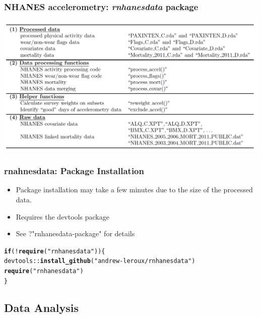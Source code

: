 \documentclass[10pt]{beamer}\usepackage[]{graphicx}\usepackage[]{color}
\makeatletter
\newcommand{\hlstr}[1]{\textcolor[rgb]{0.192,0.494,0.8}{#1}}%
\newcommand{\hlopt}[1]{\textcolor[rgb]{0,0,0}{#1}}%
\newcommand{\hlstd}[1]{\textcolor[rgb]{0.345,0.345,0.345}{#1}}%
\newcommand{\hlkwa}[1]{\textcolor[rgb]{0.161,0.373,0.58}{\textbf{#1}}}%
\newcommand{\hlkwd}[1]{\textcolor[rgb]{0.737,0.353,0.396}{\textbf{#1}}}%
\newenvironment{kframe}{%
 \def\at@end@of@kframe{}%
 \ifinner\ifhmode%
  \def\at@end@of@kframe{\end{minipage}}%
  \begin{minipage}{\columnwidth}%
 \fi\fi%
 \def\FrameCommand##1{\hskip\@totalleftmargin \hskip-\fboxsep
 \colorbox{shadecolor}{##1}\hskip-\fboxsep
     \hskip-\linewidth \hskip-\@totalleftmargin \hskip\columnwidth}%
 \MakeFramed {\advance\hsize-\width
   \@totalleftmargin\z@ \linewidth\hsize
   \@setminipage}}%
 {\par\unskip\endMakeFramed%
 \at@end@of@kframe}
\newenvironment{knitrout}{}{} %
\makeatother
\begin{document}
\begin{frame}
\frametitle{NHANES accelerometry: {\it rnhanesdata} package}
\includegraphics[width=\textwidth]{rnhanesdata}
\end{frame}


\begin{frame}[fragile]
\frametitle{rnahnesdata: Package Installation}

\begin{itemize}
\item Package installation may take a few minutes due to the size of the processed data.
\item Requires the devtools package 
\item See ?"rnhanesdata-package" for details
\end{itemize}

\begin{knitrout}\small
{}\color{fgcolor}\begin{kframe}
\begin{alltt}
\hlkwa{if}\hlstd{(}\hlopt{!}\hlkwd{require}\hlstd{(}\hlstr{"rnhanesdata"}\hlstd{))\{}
    \hlstd{devtools}\hlopt{::}\hlkwd{install_github}\hlstd{(}\hlstr{"andrew-leroux/rnhanesdata"}\hlstd{)}
    \hlkwd{require}\hlstd{(}\hlstr{"rnhanesdata"}\hlstd{)}
\hlstd{\}}
\end{alltt}
\end{kframe}
\end{knitrout}
\end{frame}



\subsection{Data Analysis}
\end{document}
